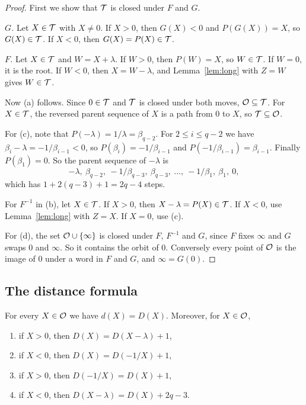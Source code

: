 \begin{proof}
First we show that $\mathcal{T}$ is closed under $F$ and $G$.

\emph{$G$.} Let $X\in\mathcal{T}$ with $X\neq0$. If $X>0$, then $G(X)<0$ and $P(G(X))=X$, so
$G(X)\in\mathcal{T}$. If $X<0$, then $G(X)=P(X)\in\mathcal{T}$.

\emph{$F$.} Let $X\in\mathcal{T}$ and $W=X+\lambda$. If $W>0$, then $P(W)=X$, so $W\in\mathcal{T}$. If $W=0$, it is
the root. If $W<0$, then $X=W-\lambda$, and Lemma~\ref{lem:long} with $Z=W$ gives $W\in\mathcal{T}$.

Now (a) follows. Since $0\in\mathcal{T}$ and $\mathcal{T}$ is closed under both moves, $\mathcal{O}\subseteq\mathcal{T}$. For
$X\in\mathcal{T}$, the reversed parent sequence of $X$ is a path from $0$ to $X$, so $\mathcal{T}\subseteq\mathcal{O}$.

For (c), note that $P(-\lambda)=1/\lambda=\beta_{q-2}$. For $2\le i\le q-2$ we have
$\beta_i-\lambda=-1/\beta_{i-1}<0$, so $P(\beta_i)=-1/\beta_{i-1}$ and $P(-1/\beta_{i-1})=\beta_{i-1}$.
Finally $P(\beta_1)=0$. So the parent sequence of $-\lambda$ is
\[
-\lambda,\ \beta_{q-2},\ -1/\beta_{q-3},\ \beta_{q-3},\ \dots,\ -1/\beta_1,\ \beta_1,\ 0,
\]
which has $1+2(q-3)+1=2q-4$ steps.

For $F^{-1}$ in (b), let $X\in\mathcal{T}$. If $X>0$, then $X-\lambda=P(X)\in\mathcal{T}$. If $X<0$, use
Lemma~\ref{lem:long} with $Z=X$. If $X=0$, use (c).

For (d), the set $\mathcal{O}\cup\{\infty\}$ is closed under $F$, $F^{-1}$ and $G$, since $F$ fixes $\infty$
and $G$ swaps $0$ and $\infty$. So it contains the orbit of $0$. Conversely every point of $\mathcal{O}$ is the
image of $0$ under a word in $F$ and $G$, and $\infty=G(0)$.
\end{proof}

\subsection{The distance formula}

\begin{theorem}\label{thm:dist}
For every $X\in\mathcal{O}$ we have $d(X)=D(X)$. Moreover, for $X\in\mathcal{O}$,
\begin{enumerate}[label={(D\arabic*)}]
\item if $X>0$, then $D(X)=D(X-\lambda)+1$,
\item if $X<0$, then $D(X)=D(-1/X)+1$,
\item if $X>0$, then $D(-1/X)=D(X)+1$,
\item[(D4$_q$)] if $X<0$, then $D(X-\lambda)=D(X)+2q-3$.
\end{enumerate}
\end{theorem}


